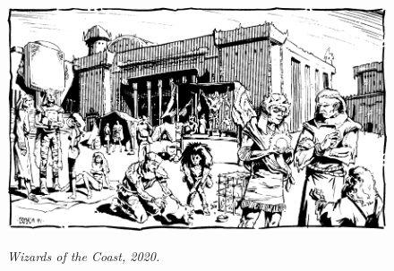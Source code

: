 \begin{figure}[b]
\centering
\includegraphics[scale=1.7]{images/market-1.png}
\par\textit{\small\textcopyright Wizards of the Coast, 2020.}
\end{figure}
